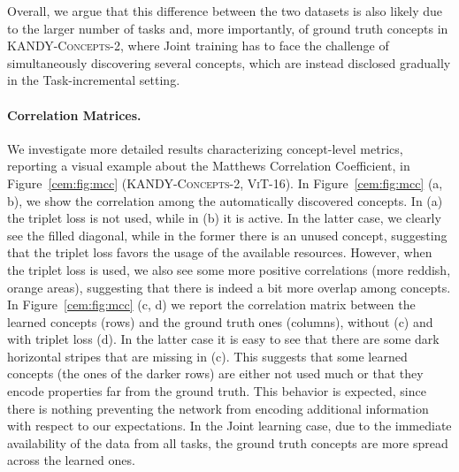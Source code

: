 %
Overall, we argue that this difference between the two datasets is also likely due to the larger number of tasks and, more importantly, of ground truth concepts in \textsc{KANDY-Concepts-2}, where Joint training has to face the challenge of simultaneously discovering several concepts, which are instead disclosed gradually in the Task-incremental setting. %

\paragraph{Correlation Matrices.} We investigate more detailed results characterizing concept-level metrics, reporting a visual example about the Matthews Correlation Coefficient, in Figure~\ref{cem:fig:mcc} (\textsc{KANDY-Concepts-2}, \textsc{ViT-16}). In Figure~\ref{cem:fig:mcc} (a, b), we show the correlation among the automatically discovered concepts. In (a) the triplet loss is not used, while in (b) it is active. In the latter case, we clearly see the filled diagonal, while in the former there is an unused concept, suggesting that the triplet loss favors the usage of the available resources. However, when the triplet loss is used, we also see some more positive correlations (more reddish, orange areas), suggesting that there is indeed a bit more overlap among concepts. In Figure~\ref{cem:fig:mcc} (c, d) we report the correlation matrix between the learned concepts (rows) and the ground truth ones (columns), without (c) and with triplet loss (d). In the latter case it is easy to see that there are some dark horizontal stripes that are missing in (c). This suggests that some learned concepts (the ones of the darker rows) are either not used much or that they encode properties far from the ground truth. This behavior is expected, since there is nothing preventing the network from encoding additional information with respect to our expectations. In the Joint learning case, due to the immediate availability of the data from all tasks, the ground truth concepts are more spread across the learned ones. %

